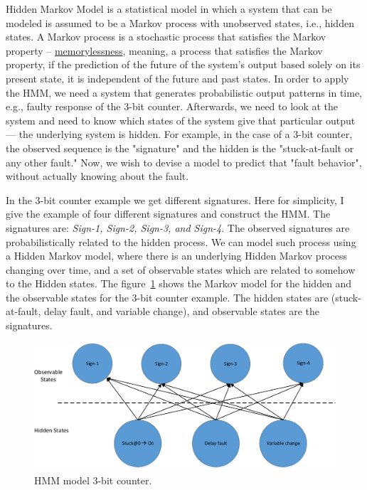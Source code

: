 Hidden Markov Model is a statistical model in which a system that can be modeled is assumed to be a Markov process with unobserved states, i.e., hidden states. A Markov process  is a stochastic process that satisfies the Markov property -- \underline{memorylessness}, meaning, a process that satisfies the Markov property, if the prediction of the future of the system's output based solely on its present state, it is independent of the future and past states. In order to apply the HMM, we need a system that generates probabilistic output patterns in time, e.g., faulty response of the 3-bit counter. Afterwards, we need to look at the system and need to know which states of the system give that particular output ---  the underlying system is hidden. For example, in the case of a 3-bit counter, the observed sequence is the "signature" and the hidden is the "stuck-at-fault or any other fault." Now, we wish to devise a model to predict that "fault behavior", without actually knowing about the fault. 

In the 3-bit counter example we  get   different signatures. Here for simplicity, I give the example of four different signatures and construct the HMM. The signatures are: \textit{Sign-1, Sign-2, Sign-3, and Sign-4}. The observed signatures are probabilistically related to the hidden process. We can model such process using a Hidden Markov model, where there is an underlying Hidden Markov process changing over time, and a set of observable states which are related to somehow to the Hidden states.
The figure~\ref{fig:HMM-3-bit} shows the Markov model for the hidden and the observable states for the 3-bit counter example. The hidden states are (stuck-at-fault, delay fault, and variable change), and observable states are  the signatures. 
\begin{figure}[tb!]
 \centering
  \captionsetup{justification=centering}    
   \includegraphics[scale=0.8]{Figures/HMM.pdf}
   \caption{HMM model 3-bit counter.}
\label{fig:HMM-3-bit}
\end{figure}

